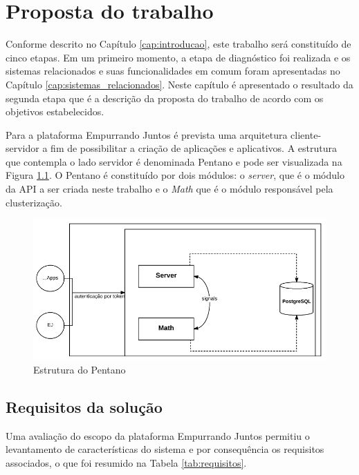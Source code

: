 \chapter{Proposta do trabalho}

Conforme descrito no Capítulo \ref{cap:introducao}, este trabalho será constituído de cinco etapas.
Em um primeiro momento, a etapa de diagnóstico foi realizada e os sistemas relacionados e suas funcionalidades em comum 
foram apresentadas no Capítulo \ref{cap:sistemas_relacionados}. Neste capítulo é apresentado o resultado da segunda etapa
que é a descrição da proposta do trabalho de acordo com os objetivos estabelecidos.

Para a plataforma Empurrando Juntos é prevista uma arquitetura cliente-servidor a fim de possibilitar a criação de aplicações e
aplicativos. A estrutura que contempla o lado servidor é denominada Pentano e pode ser visualizada na Figura \ref{fig:pentano}. 
O Pentano é constituído por dois módulos: o \textit{server}, 
que é o módulo da API a ser criada neste trabalho e o \textit{Math} que é o módulo responsável pela clusterização. 

\begin{figure}[h!]
\centering
\includegraphics[scale=0.8]{figuras/esquema_pentano.png}
\caption{Estrutura do Pentano}
\label{fig:pentano}
\end{figure}

\section{Requisitos da solução}

Uma avaliação do escopo da plataforma Empurrando Juntos permitiu o levantamento de características do sistema e por consequência
os requisitos associados, o que foi resumido na Tabela \ref{tab:requisitos}.

